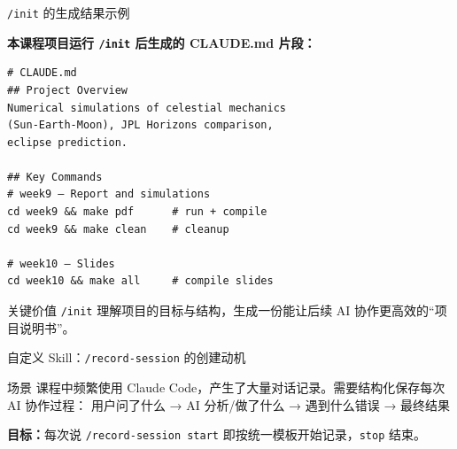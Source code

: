 \documentclass[aspectratio=169]{ctexbeamer}
\begin{document}
\begin{frame}{\texttt{/init} 的生成结果示例}
\small

\textbf{本课程项目运行 \texttt{/init} 后生成的 CLAUDE.md 片段：}

\begin{lstlisting}[basicstyle=\ttfamily\small]
# CLAUDE.md
## Project Overview
Numerical simulations of celestial mechanics
(Sun-Earth-Moon), JPL Horizons comparison,
eclipse prediction.

## Key Commands
# week9 — Report and simulations
cd week9 && make pdf      # run + compile
cd week9 && make clean    # cleanup

# week10 — Slides
cd week10 && make all     # compile slides
\end{lstlisting}

\vspace{0.1cm}

\begin{block}{关键价值}
  \texttt{/init} \alert{理解项目}的目标与结构，生成一份能让后续 AI 协作更高效的“项目说明书”。
\end{block}
\end{frame}

\begin{frame}{自定义 Skill：\texttt{/record-session} 的创建动机}
\large

\begin{alertblock}{场景}
  课程中频繁使用 Claude Code，产生了大量对话记录。需要\alert{结构化保存}每次 AI 协作过程：
  用户问了什么 → AI 分析/做了什么 → 遇到什么错误 → 最终结果
\end{alertblock}

\vspace{0.2cm}

\begin{center}
\end{center}

\vspace{0.15cm}

\normalsize
\textbf{目标：}每次说 \texttt{/record-session start} 即按统一模板开始记录，\texttt{stop} 结束。
\end{frame}
\end{document}
